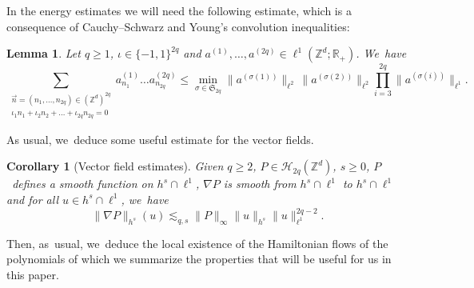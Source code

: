 \documentclass[10pt]{amsart}
\theoremstyle{plain}
\newtheorem{corollary}[theorem]{Corollary}
\newtheorem{lemma}[theorem]{Lemma}
\theoremstyle{definition}
\newcommand{\Z}{\mathbb{Z}}
\newcommand{\R}{\mathbb{R}}
\newcommand{\1}{\mathbf{1}}
\begin{document}
In the energy estimates we will need the following estimate, which is a consequence of Cauchy--Schwarz and Young's convolution inequalities:
\begin{lemma}
\label{lem:young}
Let $q\geq1$, $\iota \in \{-1,1\}^{2q}$ and $a^{(1)},\dots, a^{(2q)}\in \ell^1(\Z^d ; \R_+)$. We~have
\[
\sum_{\substack{\vec{n}=(n_1,\dots,n_{2q})\in(\Z^d)^{2q}\\ \iota_1n_1+\iota_2n_2+\dots +\iota_{2q}n_{2q}=0}}a_{n_1}^{(1)}\dots a_{n_{2q}}^{(2q)}\leq\underset{{\sigma\in\mathfrak{S}_{2q}}}\min \| a^{(\sigma(1))} \|_{\ell^2}\,\| a^{(\sigma(2))} \|_{\ell^2} \prod_{i=3}^{2q}\| a^{(\sigma(i))} \|_{\ell^1}.
\]
\end{lemma}
As usual, we~deduce some useful estimate for the vector fields.
\begin{corollary}[Vector field estimates]\label{cor:vecfi} Given $q\geq 2$, $P\in \mathcal{H}_{2q}(\mathbb{Z}^d)$, $s\geq 0$, $P$~defines a smooth function on $h^s \cap \ell^1$, $\nabla P$ is smooth from $h^s \cap \ell^1$ to $h^s \cap \ell^1$ and for all $u\in h^s \cap \ell^1$, we~have
\[
\|\nabla P\|_{h^s}(u) \lesssim_{q,s} \| P \|_{\infty} \|u\|_{h^s} \|u\|_{\ell^1}^{2q-2}.
\]
\end{corollary}
Then, as~usual, we~deduce the local existence of the Hamiltonian flows of the polynomials of which we summarize the properties that will be useful for us in this paper.
\end{document}
